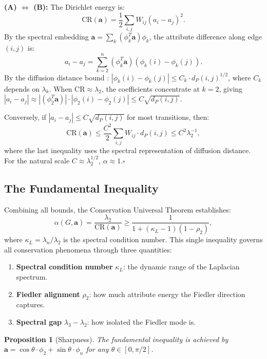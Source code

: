 \documentclass[12pt,letterpaper]{article}
\newtheorem{proposition}[theorem]{Proposition}
\newcommand{\bfa}{\mathbf{a}}
\newcommand{\CR}{\mathrm{CR}}
\begin{document}
\textbf{(A) $\iff$ (B):} The Dirichlet energy is:
\[
  \CR(\bfa) = \frac{1}{2}\sum_{i,j} W_{ij}(a_i - a_j)^2.
\]
By the spectral embedding $\bfa = \sum_k (\phi_k^T \bfa) \phi_k$, the attribute difference along edge $(i,j)$ is:
\[
  a_i - a_j = \sum_{k=2}^{n} (\phi_k^T \bfa)(\phi_k(i) - \phi_k(j)).
\]
By the diffusion distance bound \citep{nadler2006}: $|\phi_k(i) - \phi_k(j)| \leq C_k \cdot d_P(i,j)^{1/2}$, where $C_k$ depends on $\lambda_k$. When $\CR \approx \lambda_2$, the coefficients concentrate at $k=2$, giving $|a_i - a_j| \approx |(\phi_2^T \bfa)| \cdot |\phi_2(i) - \phi_2(j)| \leq C \sqrt{d_P(i,j)}$.

Conversely, if $|a_i - a_j| \leq C\sqrt{d_P(i,j)}$ for most transitions, then:
\[
  \CR(\bfa) \leq \frac{C^2}{2}\sum_{i,j} W_{ij} \cdot d_P(i,j) \leq C^2 \lambda_2^{-1},
\]
where the last inequality uses the spectral representation of diffusion distance. For the natural scale $C \approx \lambda_2^{1/2}$, $\alpha \approx 1$.\hfill$\square$

\subsection{The Fundamental Inequality}

Combining all bounds, the Conservation Universal Theorem establishes:
\begin{equation}
\label{eq:fundamental-boxed}
  \boxed{\alpha(G, \bfa) = \frac{\lambda_2}{\CR(\bfa)} \geq \frac{1}{1 + (\kappa_L - 1)(1 - \rho_2)},}
\end{equation}
where $\kappa_L = \lambda_n/\lambda_2$ is the spectral condition number. This single inequality governs all conservation phenomena through three quantities:
\begin{enumerate}
  \item \textbf{Spectral condition number} $\kappa_L$: the dynamic range of the Laplacian spectrum.
  \item \textbf{Fiedler alignment} $\rho_2$: how much attribute energy the Fiedler direction captures.
  \item \textbf{Spectral gap} $\lambda_3 - \lambda_2$: how isolated the Fiedler mode is.
\end{enumerate}

\begin{proposition}[Sharpness]
\label{prop:sharpness}
The fundamental inequality is achieved by $\bfa = \cos\theta \cdot \phi_2 + \sin\theta \cdot \phi_n$ for any $\theta \in [0, \pi/2]$.
\end{proposition}
\end{document}
